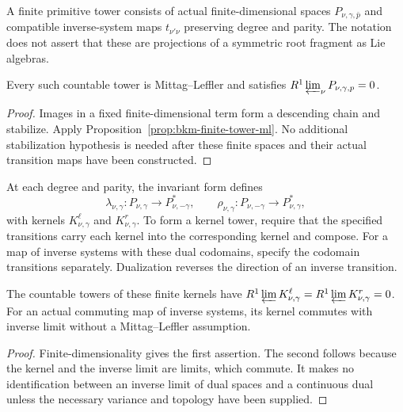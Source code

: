 \begin{definition}
\label{def:primitive-space-ml-datum}
A finite primitive tower consists of actual finite-dimensional
spaces $P_{\nu,\gamma,\bar p}$ and compatible inverse-system maps
$t_{\nu'\nu}$ preserving degree and parity. The notation does not
assert that these are projections of a symmetric root fragment as
Lie algebras.
\end{definition}

\begin{proposition}
\label{prop:primitive-space-lim1-vanishing-criterion}
Every such countable tower is Mittag--Leffler and satisfies
$R^1\varprojlim_\nu P_{\nu,\gamma,\bar p}=0$.
\end{proposition}
\begin{proof}
Images in a fixed finite-dimensional term form a descending chain
and stabilize. Apply Proposition~\ref{prop:bkm-finite-tower-ml}.
No additional stabilization hypothesis is needed after these finite
spaces and their actual transition maps have been constructed.
\end{proof}

\begin{definition}
\label{def:pairing-kernel-ml-datum}
At each degree and parity, the invariant form defines
\[
 \lambda_{\nu,\gamma}:P_{\nu,\gamma}\to P_{\nu,-\gamma}^*,
 \qquad
 \rho_{\nu,\gamma}:P_{\nu,-\gamma}\to P_{\nu,\gamma}^*,
\]
with kernels $K^\ell_{\nu,\gamma}$ and $K^r_{\nu,\gamma}$.
To form a kernel tower, require that the specified transitions
carry each kernel into the corresponding kernel and compose.
For a map of inverse systems with these dual codomains, specify
the codomain transitions separately. Dualization reverses the
direction of an inverse transition.
\end{definition}

\begin{proposition}
\label{prop:pairing-kernel-lim1-vanishing-criterion}
The countable towers of these finite kernels have
$R^1\varprojlim K^\ell_{\nu,\gamma}
=R^1\varprojlim K^r_{\nu,\gamma}=0$.
For an actual commuting map of inverse systems, its kernel
commutes with inverse limit without a Mittag--Leffler assumption.
\end{proposition}
\begin{proof}
Finite-dimensionality gives the first assertion. The second follows
because the kernel and the inverse limit are limits, which commute.
It makes no identification between an inverse limit of dual
spaces and a continuous dual unless the necessary variance and
topology have been supplied.
\end{proof}

